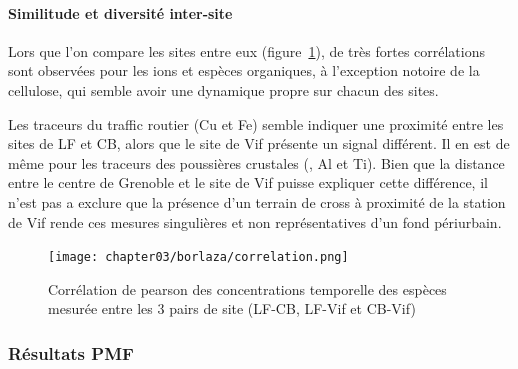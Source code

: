 \paragraph{Similitude et diversité inter-site}%
\label{par:similitude_et_diversité_inter_site}

Lors que l'on compare les sites entre eux
(figure~\ref{fig:chapter03/borlaza/correlation}), de très fortes corrélations sont
observées pour les ions et espèces organiques, à l'exception notoire de la cellulose, qui
semble avoir une dynamique propre sur chacun des sites.

Les traceurs du traffic routier (Cu et Fe) semble indiquer une proximité entre les sites de
LF et CB, alors que le site de Vif présente un signal différent. Il en est de même pour
les traceurs des poussières crustales (, Al et Ti). Bien que la distance entre
le centre de Grenoble et le site de Vif puisse expliquer cette différence, il n'est pas a
exclure que la présence d'un terrain de cross à proximité de la station de Vif rende ces
mesures singulières et non représentatives d'un fond périurbain.

\begin{figure}[ht]
    \centering
    \texttt{[image: chapter03/borlaza/correlation.png]}
    \caption{Corrélation de pearson des concentrations temporelle des espèces mesurée
    entre les 3 pairs de site (LF-CB, LF-Vif et CB-Vif)}%
    \label{fig:chapter03/borlaza/correlation}
\end{figure}

\subsubsection{Résultats PMF}%
\label{ssub:résultats_pmf}

